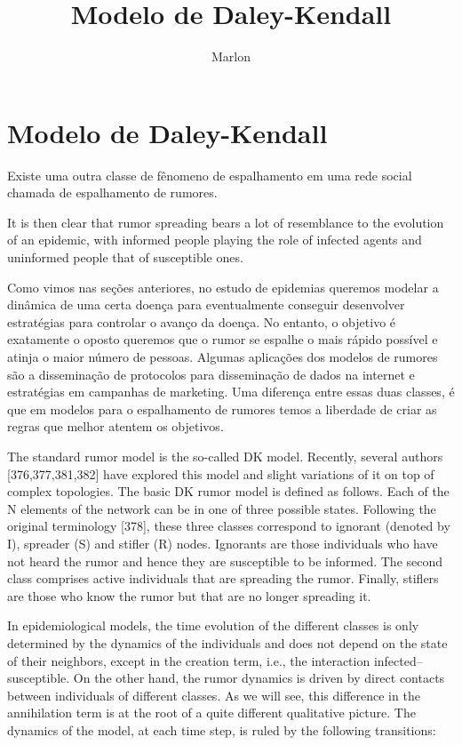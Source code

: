 \documentclass[]{article}
\begin{document}
\title{Modelo de Daley-Kendall}
\author{Marlon}
\maketitle

\section{Modelo de Daley-Kendall}

Existe uma outra classe de f\^enomeno de espalhamento em uma rede social chamada de espalhamento de rumores.

It is then clear that rumor spreading bears a lot of resemblance to the evolution of an epidemic, with informed people playing the role of infected agents and uninformed people that of susceptible ones.
 
Como vimos nas se\c{c}\~oes anteriores, no estudo de epidemias queremos modelar a din\^amica de uma certa doen\c{c}a para eventualmente conseguir desenvolver estrat\'egias para controlar o avan\c{c}o da doen\c{c}a. No entanto, o objetivo \'e exatamente o oposto queremos que o rumor se espalhe o mais r\'apido poss\'ivel e atinja o maior n\'umero de pessoas. Algumas aplica\c{c}\~oes dos modelos de rumores s\~ao a dissemina\c{c}\~ao de protocolos para dissemina\c{c}\~ao de dados na internet e estrat\'egias em campanhas de marketing. Uma diferen\c{c}a entre essas duas classes, \'e que em modelos para o espalhamento de rumores temos a liberdade de criar as regras que melhor atentem os objetivos. 

The standard rumor model is the so-called DK model. Recently, several authors [376,377,381,382] have explored this model and slight variations of it on top of complex topologies. The basic DK rumor model is defined as follows. Each of the N elements of the network can be in one of three possible states. Following the original terminology [378], these three classes correspond to ignorant (denoted by I), spreader (S) and stifler (R) nodes. Ignorants are those individuals who have not heard the rumor and hence they are susceptible to be informed. The second class comprises active individuals that are spreading the rumor. Finally, stiflers are those who know the rumor but that are no longer spreading it.

In epidemiological models, the time evolution of the different classes is only determined by the dynamics of the individuals and does not depend on the state of their neighbors, except in the creation term, i.e., the interaction infected–susceptible. On the other hand, the rumor dynamics is driven by direct contacts between individuals of different classes. As we will see, this difference in the annihilation term is at the root of a quite different qualitative picture. The dynamics of the model, at each time step, is ruled by the following transitions:
\end{document}
